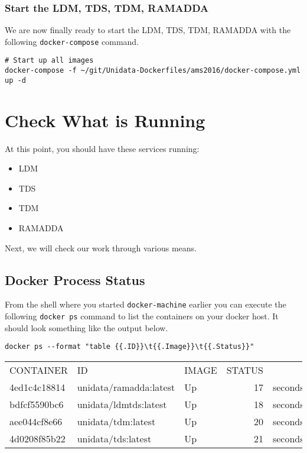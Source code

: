 \documentclass[11pt]{article}
\begin{document}
\subsubsection{Start the LDM, TDS, TDM, RAMADDA}
\label{sec:orgheadline36}

We are now finally ready to start the LDM, TDS, TDM, RAMADDA with the following \texttt{docker-compose} command.

\begin{verbatim}
# Start up all images
docker-compose -f ~/git/Unidata-Dockerfiles/ams2016/docker-compose.yml up -d
\end{verbatim}

\section{Check What is Running}
\label{sec:orgheadline43}

At this point, you should have these services running:

\begin{itemize}
\item LDM
\item TDS
\item TDM
\item RAMADDA
\end{itemize}

Next, we will check our work through various means.

\subsection{Docker Process Status}
\label{sec:orgheadline38}

From the shell where you started \texttt{docker-machine} earlier you can execute the following \texttt{docker ps} command to list the containers on your docker host. It should look something like the output below.

\begin{verbatim}
docker ps --format "table {{.ID}}\t{{.Image}}\t{{.Status}}"
\end{verbatim}

\begin{center}
\begin{tabular}{lllrl}
CONTAINER & ID & IMAGE & STATUS & \\
4ed1c4c18814 & unidata/ramadda:latest & Up & 17 & seconds\\
bdfcf5590bc6 & unidata/ldmtds:latest & Up & 18 & seconds\\
aee044cf8e66 & unidata/tdm:latest & Up & 20 & seconds\\
4d0208f85b22 & unidata/tds:latest & Up & 21 & seconds\\
\end{tabular}
\end{center}
\end{document}
